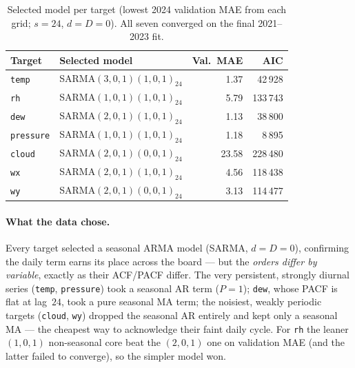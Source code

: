 \documentclass[12pt,a4paper,oneside]{report}
\begin{document}
\begin{table}[H]
\centering
\caption{Selected model per target (lowest 2024 validation MAE from each grid;
$s=24$, $d=D=0$). All seven converged on the final 2021--2023 fit.}
\label{tab:sarima-selected}
\begin{tabular}{llrr}
\toprule
\textbf{Target} & \textbf{Selected model} & \textbf{Val.\ MAE} & \textbf{AIC} \\
\midrule
\texttt{temp}     & SARMA$(3,0,1)(1,0,1)_{24}$ & 1.37  & 42\,928 \\
\texttt{rh}       & SARMA$(1,0,1)(1,0,1)_{24}$ & 5.79  & 133\,743 \\
\texttt{dew}      & SARMA$(2,0,1)(1,0,1)_{24}$ & 1.13  & 38\,800 \\
\texttt{pressure} & SARMA$(1,0,1)(1,0,1)_{24}$ & 1.18  & 8\,895 \\
\texttt{cloud}    & SARMA$(2,0,1)(0,0,1)_{24}$ & 23.58 & 228\,480 \\
\texttt{wx}       & SARMA$(2,0,1)(1,0,1)_{24}$ & 4.56  & 118\,438 \\
\texttt{wy}       & SARMA$(2,0,1)(0,0,1)_{24}$ & 3.13  & 114\,477 \\
\bottomrule
\end{tabular}
\end{table}

\paragraph{What the data chose.} Every target selected a seasonal ARMA model
(SARMA, $d{=}D{=}0$), confirming the daily term earns its place across the board
--- but the \emph{orders differ by variable}, exactly as their ACF/PACF differ.
The very persistent, strongly diurnal series (\texttt{temp}, \texttt{pressure})
took a seasonal AR term ($P{=}1$); \texttt{dew}, whose PACF is flat at lag~$24$,
took a pure seasonal MA term; the noisiest, weakly periodic targets
(\texttt{cloud}, \texttt{wy}) dropped the seasonal AR entirely and kept only a
seasonal MA --- the cheapest way to acknowledge their faint daily cycle. For
\texttt{rh} the leaner $(1,0,1)$ non-seasonal core beat the $(2,0,1)$ one on
validation MAE (and the latter failed to converge), so the simpler model won.
\end{document}
